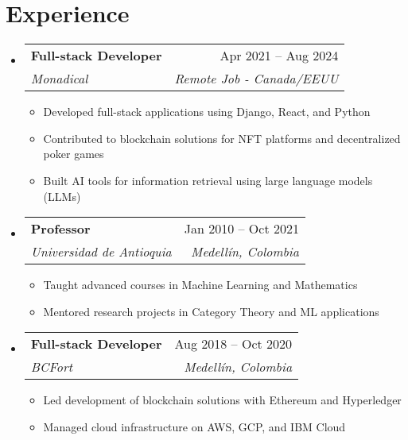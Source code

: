 \documentclass[letterpaper,11pt]{article}
\makeatletter
\newcommand{\resumeSubheading}[4]{
  \vspace{-2pt}
  \item[]
  \begin{tabular*}{\textwidth}{@{\extracolsep{\fill}}l r}
    \textbf{#1} & #2 \\
    \textit{#3} & \textit{#4} \\
  \end{tabular*}
  \vspace{-5pt}
}
\makeatother
\begin{document}
\section{Experience}
\begin{itemize}[leftmargin=0pt, itemindent=0pt, label={}]
\resumeSubheading
{Full-stack Developer}{Apr 2021 -- Aug 2024}
{Monadical}{Remote Job - Canada/EEUU}
\begin{itemize}[leftmargin=*]
    \item Developed full-stack applications using Django, React, and Python
    \item Contributed to blockchain solutions for NFT platforms and decentralized poker games
    \item Built AI tools for information retrieval using large language models (LLMs)
\end{itemize}

\resumeSubheading
{Professor}{Jan 2010 -- Oct 2021}
{Universidad de Antioquia}{Medellín, Colombia}
\begin{itemize}[leftmargin=*]
    \item Taught advanced courses in Machine Learning and Mathematics
    \item Mentored research projects in Category Theory and ML applications
\end{itemize}

\resumeSubheading
{Full-stack Developer}{Aug 2018 -- Oct 2020}
{BCFort}{Medellín, Colombia}
\begin{itemize}[leftmargin=*]
    \item  Led development of blockchain solutions with Ethereum and Hyperledger
    \item Managed cloud infrastructure on AWS, GCP, and IBM Cloud
\end{itemize}
\end{itemize}
\end{document}
